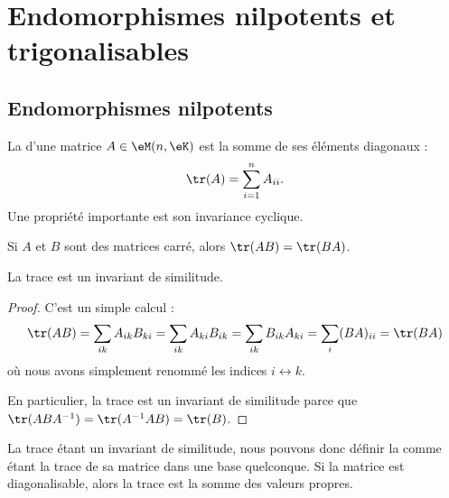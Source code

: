 

\section{Endomorphismes nilpotents et trigonalisables}

\subsection{Endomorphismes nilpotents}

La  d'une matrice \( A\in \eM(n,\eK)\) est la somme de ses éléments diagonaux :
\begin{equation}
    \tr(A)=\sum_{i=1}^nA_{ii}.
\end{equation}
Une propriété importante est son invariance cyclique.
\begin{lemma}   \label{LemhbZTay}
    Si \( A\) et \( B\) sont des matrices carré, alors \( \tr(AB)=\tr(BA)\).

    La trace est un invariant de similitude.
\end{lemma}

\begin{proof}
    C'est un simple calcul :
    \begin{equation}
            \tr(AB)=\sum_{ik}A_{ik}B_{ki}
            =\sum_{ik}A_{ki}B_{ik} 
            =\sum_{ik}B_{ik}A_{ki}
            =\sum_i(BA)_{ii}
            =\tr(BA)
    \end{equation}
    où nous avons simplement renommé les indices \( i\leftrightarrow k\).

    En particulier, la trace est un invariant de similitude parce que \( \tr(ABA^{-1})=\tr(A^{-1} AB)=\tr(B)\). 
\end{proof}
La trace étant un invariant de similitude, nous pouvons donc définir la  comme étant la trace de sa matrice dans une base quelconque. Si la matrice est diagonalisable, alors la trace est la somme des valeurs propres.

